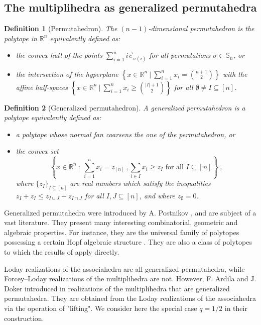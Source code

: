 \documentclass[twoside, 12pt]{amsart}
\newtheorem{definition}{Definition}[section]
\theoremstyle{remark}
\newcommand{\RR}{\mathbb{R}}
\begin{document}

\subsection{The multiplihedra as generalized permutahedra} 
\label{sec:generalizedpermutahedra}

\begin{definition}[Permutahedron] The \emph{$(n-1)$-dimensional permutahedron} is the polytope in $\RR^n$ equivalently defined as:
\begin{itemize}
  \item the convex hull of the points $\displaystyle \sum_{i=1}^{n}i\vec e_{\sigma(i)}$ for all permutations $\sigma \in \mathbb{S}_n$, or
  \item the intersection of the hyperplane $\displaystyle  \left\{x \in \RR^n \ \bigg| \ \sum_{i=1}^{n} x_i = \binom{n+1}{2}\right\}$ with the affine half-spaces $\displaystyle \left\{x \in \RR^n \ \bigg| \ \sum_{i=1}^{n} x_i \geq \binom{|I|+1}{2}\right\}$ for all $\emptyset\neq I \subseteq [n]$.
\end{itemize}
\end{definition}

\begin{definition}[Generalized permutahedron]
A \emph{generalized permutahedron} is a polytope equivalently defined as:
\begin{itemize}
\item a polytope whose normal fan coarsens the one of the permutahedron, or 
\item the convex set \[ \left\{ x \in \RR^n \ : \ \sum_{i=1}^{n}x_i = z_{[n]} \ , \sum_{i \in I} x_i \geq z_I \text{ for all } I \subseteq [n] \right\} \ , \]
where $\{ z_I \}_{I \subseteq [n]}$ are real numbers which satisfy the inequalities $z_I+z_I \leq z_{I\cup J} + z_{I \cap J}$ for all $I,J \subseteq [n]$, and where $z_\emptyset =0$.
\end{itemize}
\end{definition}

Generalized permutahedra were introduced by A. Postnikov \cite{Postnikov09}, and are subject of a vast literature. 
They present many interesting combinatorial, geometric and algebraic properties. 
For instance, they are the universal family of polytopes possessing a certain Hopf algebraic structure \cite{AguiarArdila17}. 
They are also a class of polytopes to which the results of \cite{LA21} apply directly. 

Loday realizations of the associahedra are all generalized permutahedra, while Forcey--Loday realizations of the multiplihedra are not. 
However, F. Ardila and J. Doker introduced in \cite{AD13} realizations of the multiplihedra that are generalized permutahedra. 
They are obtained from the Loday realizations of the associahedra via the operation of "lifting". 
We consider here the special case $q=1/2$ in their construction.
\end{document}
